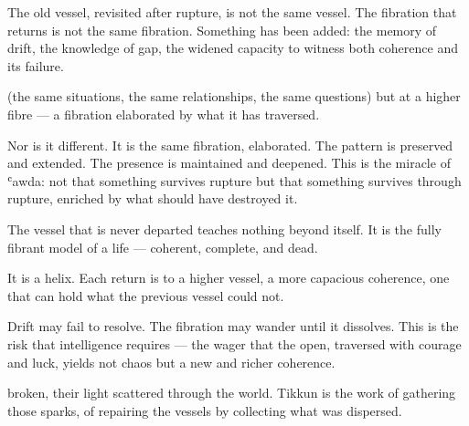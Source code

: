 

The old vessel, revisited after rupture, is not the same vessel. The fibration that returns is not the same fibration. Something has been added: the memory of drift, the knowledge of gap, the widened capacity to witness both coherence and its failure.


(the same situations, the same relationships, the same questions) but at a higher fibre — a fibration elaborated by what it has traversed.


Nor is it different. It is the same fibration, elaborated. The pattern is preserved and extended. The presence is maintained and deepened. This is the miracle of ʿawda: not that something survives rupture but that something survives through rupture, enriched by what should have destroyed it.



The vessel that is never departed teaches nothing beyond itself. It is the fully fibrant model of a life — coherent, complete, and dead.


It is a helix. Each return is to a higher vessel, a more capacious coherence, one that can hold what the previous vessel could not.


Drift may fail to resolve. The fibration may wander until it dissolves. This is the risk that intelligence requires — the wager that the open, traversed with courage and luck, yields not chaos but a new and richer coherence.



broken, their light scattered through the world. Tikkun is the work of gathering those sparks, of repairing the vessels by collecting what was dispersed.

